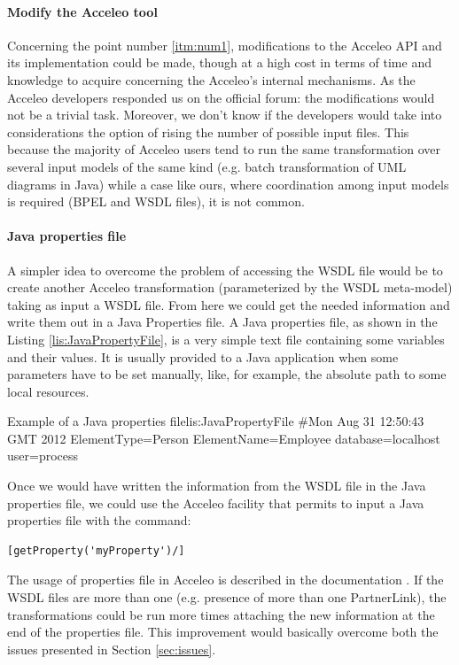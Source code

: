 \paragraph{Modify the Acceleo tool}
Concerning the point number \ref{itm:num1}, modifications to the Acceleo API and its implementation could be made, though at a high cost in terms of time and knowledge to acquire concerning the Acceleo's internal mechanisms. As the Acceleo developers responded us on the official forum: the modifications would not be a trivial task.
Moreover, we don't know if the developers would take into considerations the option of rising the number of possible input files. This because the majority of Acceleo users tend to run the same transformation over several input models of the same kind (e.g. batch transformation of UML diagrams in Java) while a case like ours, where coordination among input models is required (BPEL and WSDL files), it is not common.

\paragraph{Java properties file}
A simpler idea to overcome the problem of accessing the WSDL file would be to create another Acceleo transformation (parameterized by the WSDL meta-model) taking as input a WSDL file. From here we could get the needed information and write them out in a Java Properties file. A Java properties file, as shown in the Listing \ref{lis:JavaPropertyFile}, is a very simple text file containing some variables and their values. It is usually provided to a Java application when some parameters have to be set manually, like, for example, the absolute path to some local resources.

\begin{center}
  \begin{minipage}{1\textwidth}
    \begin{java-code}{Example of a Java properties file}{lis:JavaPropertyFile}
#Mon Aug 31 12:50:43 GMT 2012
ElementType=Person
ElementName=Employee
database=localhost
user=process
    \end{java-code}
  \end{minipage}
\end{center}

Once we would have written the information from the WSDL file in the Java properties file, we could use the Acceleo facility that permits to input a Java properties file with the command:\\
\begin{verbatim}[getProperty('myProperty')/]\end{verbatim} 
The usage of properties file in Acceleo is described in the documentation \cite{acceleoDoc}. If the WSDL files are more than one (e.g. presence of more than one PartnerLink), the transformations could be run more times attaching the new information at the end of the properties file.
This improvement would basically overcome both the issues presented in Section \ref{sec:issues}.

